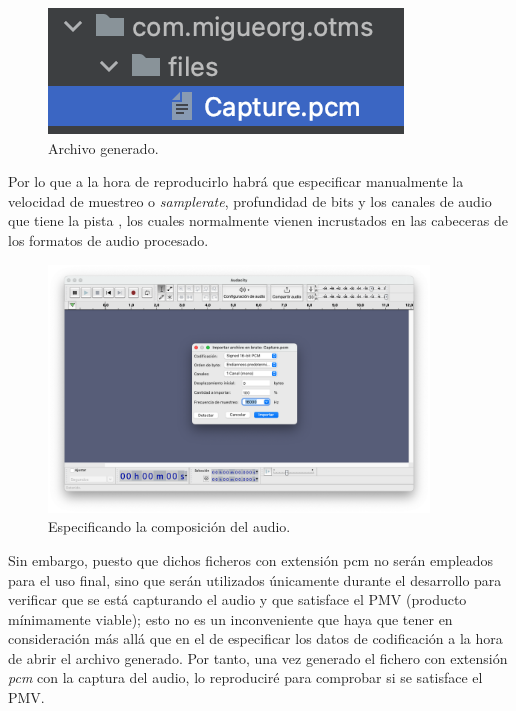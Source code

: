 \begin{figure}[h!]
    \centering
    \includegraphics{fotos/archivo_generado.png}
    \caption{Archivo generado.}
\end{figure}


Por lo que a la hora de reproducirlo habrá que especificar manualmente la
velocidad de muestreo o \emph{samplerate}, profundidad de bits y los canales de
audio que tiene la pista \cite{audio-samplerate}, los cuales normalmente vienen
incrustados en las cabeceras de los formatos de audio procesado.

\begin{figure}[H]
    \centering
    \includegraphics[width=0.9\textwidth]{fotos/importando_datos_en_bruto_audacity.png}
    \caption{Especificando la composición del audio.}
\end{figure}

Sin embargo, puesto que dichos ficheros con extensión pcm no serán empleados para
el uso final, sino que serán utilizados únicamente durante el desarrollo
para verificar que se está capturando el audio y que satisface el PMV (producto
mínimamente viable); esto no es un inconveniente que haya que tener en
consideración más allá que en el de especificar los datos de codificación a la
hora de abrir el archivo generado. Por tanto, una vez generado el fichero con
extensión \emph{pcm} con la captura del audio, lo reproduciré para comprobar si
se satisface el PMV. 

